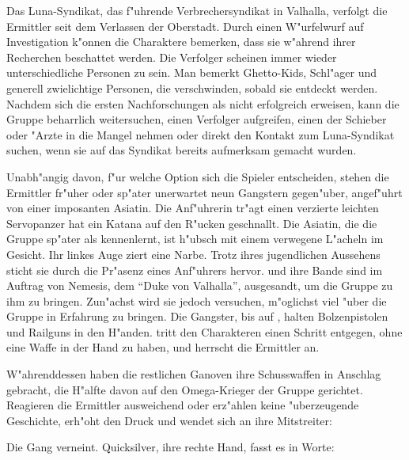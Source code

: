 
Das Luna-Syndikat, das f"uhrende Verbrechersyndikat in Valhalla, verfolgt die Ermittler seit dem Verlassen der Oberstadt. Durch einen W"urfelwurf auf Investigation k"onnen die Charaktere bemerken, dass sie w"ahrend ihrer Recherchen beschattet werden. Die Verfolger scheinen immer wieder unterschiedliche Personen zu sein. Man bemerkt Ghetto-Kids, Schl"ager und generell zwielichtige Personen, die verschwinden, sobald sie entdeckt werden. Nachdem sich die ersten Nachforschungen als nicht erfolgreich erweisen, kann die Gruppe beharrlich weitersuchen, einen Verfolger aufgreifen, einen der Schieber oder "Arzte in die Mangel nehmen oder direkt den Kontakt zum Luna-Syndikat suchen, wenn sie auf das Syndikat bereits aufmerksam gemacht wurden.

Unabh"angig davon, f"ur welche Option sich die Spieler entscheiden, stehen die Ermittler fr"uher oder sp"ater unerwartet neun Gangstern gegen"uber, angef"uhrt von einer imposanten Asiatin. Die Anf"uhrerin tr"agt einen verzierte leichten Servopanzer hat ein Katana auf den R"ucken geschnallt. Die Asiatin, die die Gruppe sp"ater als \xls{} kennenlernt, ist h"ubsch mit einem verwegene L"acheln im Gesicht. Ihr linkes Auge ziert eine Narbe. Trotz ihres jugendlichen Aussehens sticht sie durch die Pr"asenz eines Anf"uhrers hervor. \xl{} und ihre Bande sind im Auftrag von Nemesis, dem ``Duke von Valhalla'', ausgesandt, um die Gruppe zu ihm zu bringen. Zun"achst wird sie jedoch versuchen, m"oglichst viel "uber die Gruppe in Erfahrung zu bringen. Die Gangster, bis auf \xl{}, halten Bolzenpistolen und Railguns in den H"anden. \xl{} tritt den Charakteren einen Schritt entgegen, ohne eine Waffe in der Hand zu haben, und herrscht die Ermittler an.


W"ahrenddessen haben die restlichen Ganoven ihre Schusswaffen in Anschlag gebracht, die H"alfte davon auf den Omega-Krieger der Gruppe gerichtet. Reagieren die Ermittler ausweichend oder erz"ahlen keine "uberzeugende Geschichte, erh"oht \xl{} den Druck und wendet sich an ihre Mitstreiter:


Die Gang verneint. Quicksilver, ihre rechte Hand, fasst es in Worte: 

